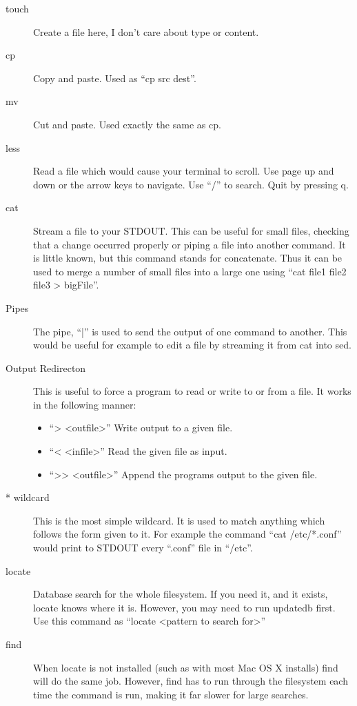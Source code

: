 \documentclass[a4paper,11pt]{report}
\begin{document}
\begin{description}
			\item[touch]
				Create a file here, I don't care about type or content. 
			\item[cp]
				Copy and paste. Used as ``cp src dest''.
			\item[mv]
				Cut and paste. Used exactly the same as cp. 
			\item[less]
				Read a file which would cause your terminal to scroll. 
				Use page up and down or the arrow keys to navigate. 
				Use ``/'' to search.
				Quit by pressing q.
			\item[cat]
				Stream a file to your STDOUT. 
				This can be useful for small files, checking that a change occurred properly or piping a file into another command. 
				It is little known, but this command stands for concatenate. 
				Thus it can be used to merge a number of small files into a large one using ``cat file1 file2 file3 > bigFile''.
			\item[Pipes]
				The pipe, ``|'' is used to send the output of one command to another. 
				This would be useful for example to edit a file by streaming it from cat into sed. 
			\item[Output Redirecton]
				This is useful to force a program to read or write to or from a file. 
				It works in the following manner:
				\begin{itemize}
					\item ``> <outfile>'' Write output to a given file.
					\item ``< <infile>'' Read the given file as input.
					\item ``>> <outfile>'' Append the programs output to the given file. 
				\end{itemize}
			\item[\** wildcard]
				This is the most simple wildcard. 
				It is used to match anything which follows the form given to it. 
				For example the command ``cat /etc/\**.conf'' would print to STDOUT every ``.conf'' file in ``/etc''.
			\item[locate]
				Database search for the whole filesystem. 
				If you need it, and it exists, locate knows where it is. 
				However, you may need to run updatedb first. 
				Use this command as ``locate <pattern to search for>''
			\item[find]
				When locate is not installed (such as with most Mac OS X installs) find will do the same job. 
				However, find has to run through the filesystem each time the command is run, making it far slower for large searches. 

\end{description}
\end{document}
